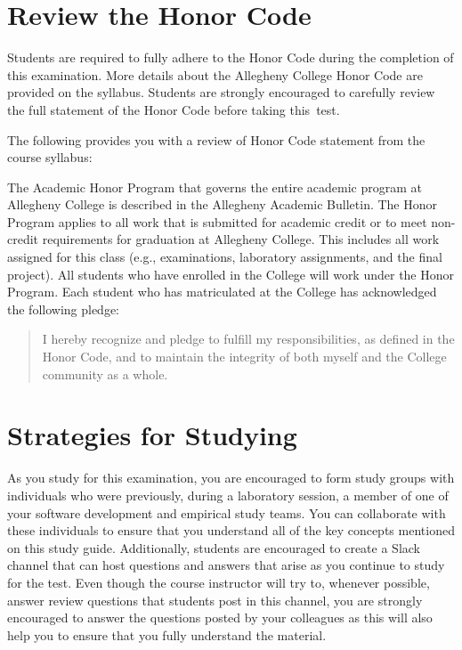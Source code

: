 \vspace*{-.2in}
\section*{Review the Honor Code}
\vspace*{-.1in}

\noindent Students are required to fully adhere to the Honor Code during the completion of this examination. More
details about the Allegheny College Honor Code are provided on the syllabus. Students are strongly encouraged to
carefully review the full statement of the Honor Code before taking \mbox{this test}.

\noindent The following provides you with a review of Honor Code statement from the course syllabus:

The Academic Honor Program that governs the entire academic program at Allegheny College is described in the Allegheny
Academic Bulletin.  The Honor Program applies to all work that is submitted for academic credit or to meet non-credit
requirements for graduation at Allegheny College.  This includes all work assigned for this class (e.g., examinations,
laboratory assignments, and the final project).  All students who have enrolled in the College will work under the Honor
Program.  Each student who has matriculated at the College has acknowledged the following pledge:

\vspace*{-.11in}
\begin{quote}
  I hereby recognize and pledge to fulfill my responsibilities, as defined in the Honor Code, and to maintain the
  integrity of both myself and the College community as a whole.
\end{quote}
\vspace*{-.11in}

\vspace*{-.2in}
\section*{Strategies for Studying}
\vspace*{-.1in}

As you study for this examination, you are encouraged to form study groups with individuals who were previously, during
a laboratory session, a member of one of your software development and empirical study teams. You can collaborate with
these individuals to ensure that you understand all of the key concepts mentioned on this study guide. Additionally,
students are encouraged to create a Slack channel that can host questions and answers that arise as you continue to
study for the test.  Even though the course instructor will try to, whenever possible, answer review questions that
students post in this channel, you are strongly encouraged to answer the questions posted by your colleagues as this
will also help you to ensure that you fully understand the material.

